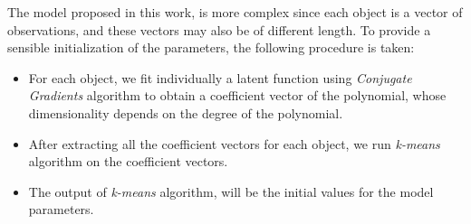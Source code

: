 The model proposed in this work, is more complex since each object is a vector of observations, and these vectors may also be of different length. To provide a sensible initialization of the parameters, the following procedure is taken:
\begin{itemize}
	\item{For each object, we fit individually a latent function using \emph{Conjugate Gradients} algorithm to obtain a coefficient vector of the polynomial, whose dimensionality depends on the degree of the polynomial.}
	\item{After extracting all the coefficient vectors for each object, we run \emph{k-means} algorithm on the coefficient vectors.}
	\item{The output of \emph{k-means} algorithm, will be the initial values for the model parameters.}
\end{itemize}
